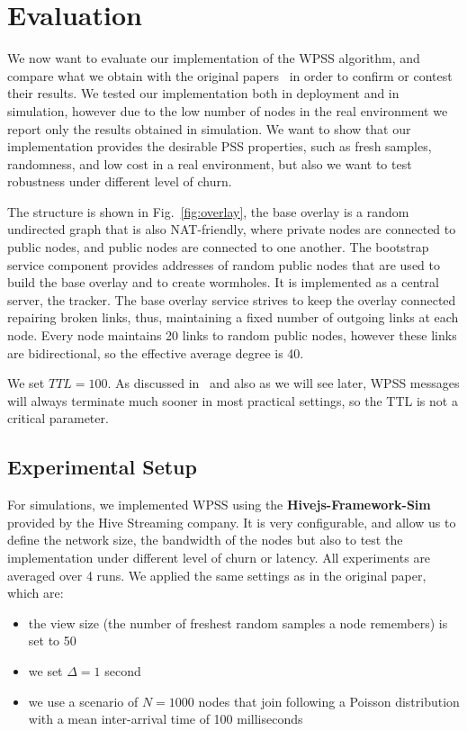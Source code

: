 
\chapter{Evaluation}
\label{cha:evaluation}
We now want to evaluate our implementation of the WPSS algorithm, and compare what we obtain with the original papers~\cite{wormhole} in order to confirm or contest their results. We tested our implementation both in deployment and in simulation, however due to the low number of nodes in the real environment we report only the results obtained in simulation. We want to show that our implementation provides the desirable PSS properties, such as fresh samples, randomness, and low cost in a real environment, but also we want to test robustness under different level of churn.

The structure is shown in Fig.~\ref{fig:overlay}, the base overlay is a random undirected graph that is also NAT-friendly, where private nodes are connected to public nodes, and public nodes are connected to one another. The bootstrap service component provides addresses of random public nodes that are used to build the base overlay and to create wormholes. It is implemented as a central server, the tracker. The base overlay service strives to keep the overlay connected repairing broken links, thus, maintaining a fixed number of outgoing links at each node. Every node maintains 20 links to random public nodes, however these links are bidirectional, so the effective average degree is 40. 

We set $TTL = 100$. As discussed in~\cite{wormhole} and also as we will see later, WPSS messages will always terminate much sooner in most practical settings, so the TTL is not a critical parameter.

\section{Experimental Setup}
\label{sec:exp_setup}
For simulations, we implemented WPSS using the \textbf{Hivejs-Framework-Sim} provided by the Hive Streaming company. It is very configurable, and allow us to define the network size, the bandwidth of the nodes but also to test the implementation under different level of churn or latency. All experiments are averaged over 4 runs. We applied the same settings as in the original paper, which are: 

\begin{itemize}
	\item the view size (the number of freshest random samples a node remembers) is set to 50
	\item we set $\Delta = 1$ second
	\item we use a scenario of $N = 1000$ nodes that join following a Poisson distribution with a mean inter-arrival time of 100 milliseconds
\end{itemize}

